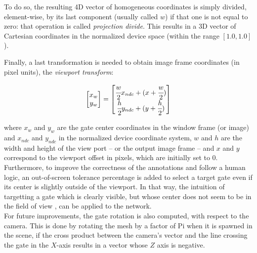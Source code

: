 
To do so, the resulting 4D vector of homogeneous coordinates is simply divided,
element-wise, by its last component (usually called $w$) if that one is not
equal to zero: that operation is called \emph{projection divide}. This results
in a 3D vector of Cartesian coordinates in the normalized device space (within
the range $[1.0, 1.0]$).

Finally, a last transformation is needed to obtain image frame coordinates (in
pixel units), the \emph{viewport transform}:

\begin{equation}
	\begin{bmatrix}
		x_w\\y_w
	\end{bmatrix}
	=
	\begin{bmatrix}
		\cfrac{w}{2} x_{ndc} + (x + \cfrac{w}{2})\\
		\cfrac{h}{2} y_{ndc} + (y + \cfrac{h}{2})\\
	\end{bmatrix}
\end{equation}

where $x_w$ and $y_w$ are the gate center coordinates in the window
frame (or image) and $x_{ndc}$ and $y_{ndc}$ in the normalized device
coordinate system, $w$ and $h$ are the width and height of the view port -- or
the output image frame -- and $x$ and $y$ correspond to the viewport offset in
pixels, which are initially set to 0.\\

Furthermore, to improve the correctness of the annotations and follow a human
logic, an out-of-screen tolerance percentage is added to select a target gate
even if its center is slightly outside of the viewport. In that way, the
intuition of targetting a gate which is clearly visible, but whose center does
not seem to be in the field of view , can be applied to the network.\\

For future improvements, the gate rotation is also computed, with respect to
the camera. This is done by rotating the mesh by a factor of Pi when it is
spawned in the scene, if the cross product between the camera's vector and the
line crossing the gate in the $X$-axis results in a vector whose $Z$ axis is
negative.
